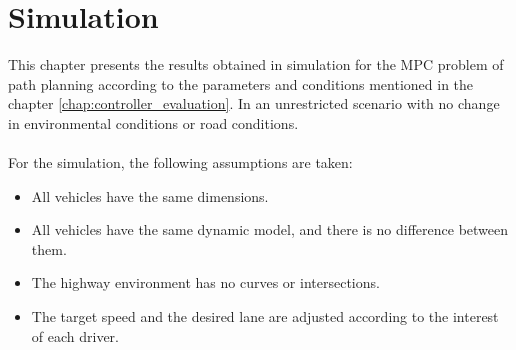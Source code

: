 
\chapter{Simulation}
\label{chap:simulations}

This chapter presents the results obtained in simulation for the MPC problem of path planning according to the parameters and conditions mentioned in the chapter \ref{chap:controller_evaluation}. In an unrestricted scenario with no change in environmental conditions or road conditions.
\\
\\
For the simulation, the following assumptions are taken:
\begin{itemize}
    \item All vehicles have the same dimensions.
    \item All vehicles have the same dynamic model, and there is no difference between them.
    \item The highway environment has no curves or intersections.
    \item The target speed and the desired lane are adjusted according to the interest of each driver.
\end{itemize}

